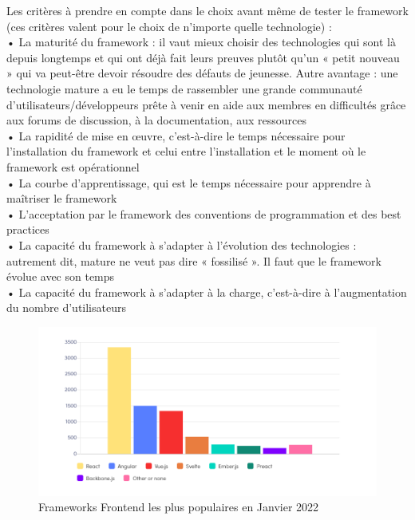 Les critères à prendre en compte dans le choix avant même de tester le framework (ces critères valent pour le choix de n’importe quelle technologie) :\\
•	La maturité du framework : il vaut mieux choisir des technologies qui sont là depuis 
longtemps et qui ont déjà fait leurs preuves plutôt qu’un  « petit nouveau » qui va peut-être devoir
 résoudre des défauts de jeunesse. Autre avantage : une technologie mature a eu le temps de rassembler
  une grande communauté d’utilisateurs/développeurs prête à venir en aide aux membres en difficultés 
  grâce aux forums de discussion, à la documentation, aux ressources\\
•	La rapidité de mise en œuvre, c’est-à-dire le temps nécessaire pour l’installation du 
framework et celui entre l’installation et le moment où le framework est opérationnel\\
•	La courbe d’apprentissage, qui est le temps nécessaire pour apprendre à maîtriser le framework\\
•	L’acceptation par le framework des conventions de programmation et des best practices\\
•	La capacité du framework à s’adapter à l’évolution des technologies : autrement dit, mature 
ne veut pas dire « fossilisé ».  Il faut que le framework évolue avec son temps\\
•	La capacité du framework à s’adapter à la charge, c’est-à-dire à l’augmentation du nombre 
d’utilisateurs\\
\begin{figure}[hp]
    \centering
    \includegraphics{images/frontend_frameworks.png}
    \caption{Frameworks Frontend les plus populaires en Janvier 2022}
\end{figure}
\pagebreak

